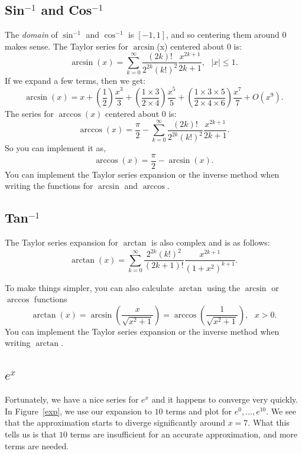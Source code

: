 \documentclass[11pt]{article}
\newcommand{\mlarcterm}[1]{\frac{x^{#1}}{#1}}
\begin{document}
\subsection{Sin$^{-1}$ and Cos$^{-1}$}

The \emph{domain} of $\sin^{-1}$ and $\cos^{-1}$ is $[-1, 1]$, and so centering them
around $0$ makes sense. The Taylor series for $\arcsin$(x) centered about $0$ is:
\[
  \arcsin(x)= \sum_{k=0}^\infty \frac{(2k)!}{2^{2k}(k!)^2}\frac{x^{2k
  +1}}{2k+1}, \ \ \ |x| \leq 1.
\]
If we expand a few terms, then we get:
\[
  \arcsin(x) = x + \left( \frac{1}{2} \right) \mlarcterm{3} +   \left(
  \frac{1 \times 3}{2 \times 4} \right) \mlarcterm{5} + \left( \frac{1
\times 3 \times 5}{2 \times 4 \times 6} \right) \mlarcterm{7}  + O(x^{9}).
\]
The series for $\arccos(x)$ centered about $0$ is:
\[
  \arccos(x)= \frac{\pi}{2} - \sum_{k=0}^{\infty}
  \frac{(2k)!}{2^{2k}(k!)^2}  \frac{x^{2k + 1}}{2k + 1}.
\]
So you can implement it as,
\[
  \arccos(x) = \frac{\pi}{2} - \arcsin(x).
\]
You can implement the Taylor series expansion or the inverse method when
writing the functions for $\arcsin$ and $\arccos$.


\subsection{Tan$^{-1}$}

The Taylor series expansion for $\arctan$ is also complex and is as follows:
\[
  \arctan(x) = \sum_{k=0}^\infty \frac{2^{2k}
  (k!)^2}{(2k+1)!}\frac{x^{2k+1}}{(1+x^2)^{k+1}}.
\]

\noindent To make things simpler, you can also calculate $\arctan$ using the $\arcsin$ or $\arccos$ functions
\[
  \arctan(x) = \arcsin \left( \frac{x}{\sqrt{x^2 + 1}} \right) = \arccos
  \left( \frac{1}{\sqrt{x^2 + 1}} \right), \ \ \ x > 0.
\]
You can implement the Taylor series expansion or the inverse method when writing $\arctan$.

\subsection{\Large $e^x$}

Fortunately, we have a nice series for $e^x$ and it happens to converge very
quickly. In Figure~\ref{exp}, we use our expansion to $10$ terms and plot for
$e^0,\ldots,e^{10}$. We see that the approximation starts to diverge
significantly around $x = 7$. What this tells us is that $10$ terms are insufficient
for an accurate approximation, and more terms are needed.
\end{document}
